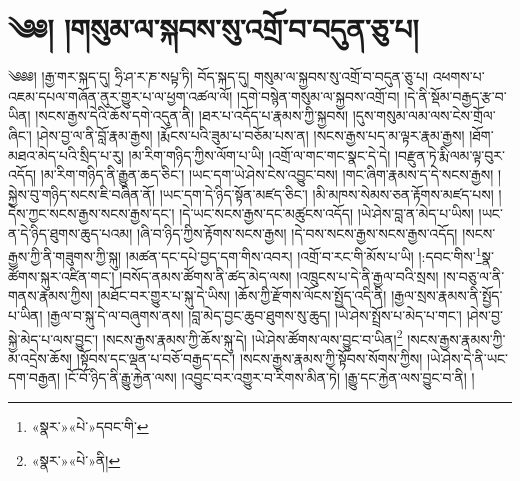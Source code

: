 \chapter{༄༅། །གསུམ་ལ་སྐབས་སུ་འགྲོ་བ་བདུན་ཅུ་པ།}༄༅༅། །རྒྱ་གར་སྐད་དུ། ཧྲི་ཤ་ར་ཎ་སཔྟ་ཏི། བོད་སྐད་དུ། གསུམ་ལ་སྐྱབས་སུ་འགྲོ་བ་བདུན་ཅུ་པ། འཕགས་པ་འཇམ་དཔལ་གཞོན་ནུར་གྱུར་པ་ལ་ཕྱག་འཚལ་ལོ། །དགེ་བསྙེན་གསུམ་ལ་སྐྱབས་འགྲོ་བ། །དེ་ནི་སྡོམ་བརྒྱད་རྩ་བ་ཡིན། །སངས་རྒྱས་དེའི་ཆོས་དགེ་འདུན་ནི། །ཐར་པ་འདོད་པ་རྣམས་ཀྱི་སྐྱབས། །དུས་གསུམ་ལམ་ལས་ངེས་གྲོལ་ཞིང་། །ཤེས་བྱ་ལ་ནི་བློ་རྣམ་རྒྱས། །རྨོངས་པའི་ཟུམ་པ་བཅོམ་པས་ན། །སངས་རྒྱས་པད་མ་ལྟར་རྣམ་རྒྱས། །ཐོག་མཐའ་མེད་པའི་སྲིད་པ་རུ། །མ་རིག་གཉིད་ཀྱིས་ལོག་པ་ཡི། །འགྲོ་ལ་གང་གང་སྣང་དེ་དེ། །བརྫུན་ཏེ་རྨི་ལམ་ལྟ་བུར་འདོད། །མ་རིག་གཉིད་ནི་རྒྱུན་ཆད་ཅིང་། །ཡང་དག་ཡེ་ཤེས་ངེས་འབྱུང་བས། །གང་ཞིག་རྣམས་ད་དེ་སངས་རྒྱས། །སྐྱེས་བུ་གཉིད་སངས་ཇི་བཞིན་ནོ། །ཡང་དག་དེ་ཉིད་སྟོན་མཛད་ཅིང་། །མི་མཁས་སེམས་ཅན་རྟོགས་མཛད་པས། །དེས་ཀྱང་སངས་རྒྱས་སངས་རྒྱས་དང་། །དེ་ཡང་སངས་རྒྱས་དང་མཚུངས་འདོད། །ཡེ་ཤེས་བླ་ན་མེད་པ་ཡིས། །ཡང་ན་དེ་ཉིད་ཐུགས་ཆུད་པའམ། །ཞི་བ་ཉིད་ཀྱིས་རྟོགས་སངས་རྒྱས། །དེ་བས་སངས་རྒྱས་སངས་རྒྱས་འདོད། །སངས་རྒྱས་ཀྱི་ནི་གཟུགས་ཀྱི་སྐུ། །མཚན་དང་དཔེ་བྱད་དག་གིས་འབར། །འགྲོ་བ་རང་གི་མོས་པ་ཡི། །:དབང་གིས་\footnote{«སྣར་»«པེ་»དབང་གི་}སྣ་ཚོགས་སྐུར་འཛིན་གང་། །བསོད་ནམས་ཚོགས་ནི་ཚད་མེད་ལས། །འཁྲུངས་པ་དེ་ནི་རྒྱལ་བའི་སྲས། །ས་བཅུ་ལ་ནི་གནས་རྣམས་ཀྱིས། །མཐོང་བར་གྱུར་པ་སྐུ་དེ་ཡིས། །ཆོས་ཀྱི་རྫོགས་ལོངས་སྤྱོད་འདི་ནི། །རྒྱལ་སྲས་རྣམས་ནི་སྤྱོད་པ་ཡིན། །རྒྱལ་བ་སྐུ་དེ་ལ་བཞུགས་ནས། །བླ་མེད་བྱང་ཆུབ་ཐུགས་སུ་ཆུད། །ཡེ་ཤེས་སྤྲོས་པ་མེད་པ་གང་། །ཤེས་བྱ་སྐྱེ་མེད་པ་ལས་བྱུང་། །སངས་རྒྱས་རྣམས་ཀྱི་ཆོས་སྐུ་དེ། །ཡེ་ཤེས་ཚོགས་ལས་བྱུང་བ་ཡིན།\footnote{«སྣར་»«པེ་»ནི།} །སངས་རྒྱས་རྣམས་ཀྱི་མ་འདྲེས་ཆོས། །སྟོབས་དང་ལྡན་པ་བཅོ་བརྒྱད་དང་། །སངས་རྒྱས་རྣམས་ཀྱི་སྟོབས་སོགས་ཀྱིས། །ཡེ་ཤེས་དེ་ནི་ཡང་དག་བརྒྱན། །ངོ་བོ་ཉིད་ནི་རྒྱུ་རྐྱེན་ལས། །འབྱུང་བར་འགྱུར་བ་རིགས་མིན་ཏེ། །རྒྱུ་དང་རྐྱེན་ལས་བྱུང་བ་ནི། །
